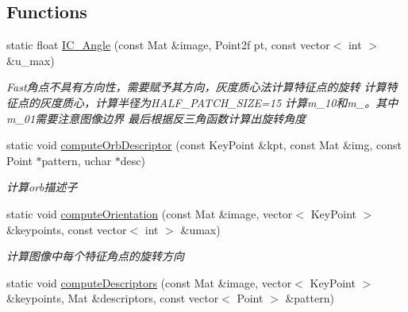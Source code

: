 \subsection*{Functions}
\begin{DoxyCompactItemize}
\item 
static float \mbox{\hyperlink{namespace_o_r_b___s_l_a_m2_ac570dbdaae2d483745515b5022fd6820}{I\+C\+\_\+\+Angle}} (const Mat \&image, Point2f pt, const vector$<$ int $>$ \&u\+\_\+max)
\begin{DoxyCompactList}\small\item\em Fast角点不具有方向性，需要赋予其方向，灰度质心法计算特征点的旋转 计算特征点的灰度质心，计算半径为\+H\+A\+L\+F\+\_\+\+P\+A\+T\+C\+H\+\_\+\+S\+I\+ZE=15 计算m\+\_\+10和m\+\_。其中m\+\_\+01需要注意图像边界 最后根据反三角函数计算出旋转角度 \end{DoxyCompactList}\item 
static void \mbox{\hyperlink{namespace_o_r_b___s_l_a_m2_a932693f631bfe871700d02c72e14c6cd}{compute\+Orb\+Descriptor}} (const Key\+Point \&kpt, const Mat \&img, const Point $\ast$pattern, uchar $\ast$desc)
\begin{DoxyCompactList}\small\item\em 计算orb描述子 \end{DoxyCompactList}\item 
static void \mbox{\hyperlink{namespace_o_r_b___s_l_a_m2_a40adb6b621d7c2dd9d2961ba88e445c8}{compute\+Orientation}} (const Mat \&image, vector$<$ Key\+Point $>$ \&keypoints, const vector$<$ int $>$ \&umax)
\begin{DoxyCompactList}\small\item\em 计算图像中每个特征角点的旋转方向 \end{DoxyCompactList}\item 
static void \mbox{\hyperlink{namespace_o_r_b___s_l_a_m2_ad90997cdb916a99c644c0959e08cf4df}{compute\+Descriptors}} (const Mat \&image, vector$<$ Key\+Point $>$ \&keypoints, Mat \&descriptors, const vector$<$ Point $>$ \&pattern)
\end{DoxyCompactItemize}
